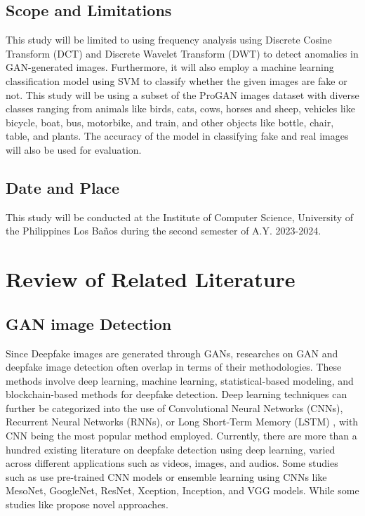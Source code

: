 \documentclass[journal]{./IEEE/IEEEtran}
\begin{document}
\subsection{Scope and Limitations}
This study will be limited to using frequency analysis using Discrete Cosine Transform (DCT) and Discrete Wavelet Transform (DWT) to detect anomalies in GAN-generated images. Furthermore, it will also employ a machine learning classification model using SVM to classify whether the given images are fake or not. This study will be using a subset of the ProGAN images dataset with diverse classes ranging from animals like birds, cats, cows, horses and sheep, vehicles like bicycle, boat, bus, motorbike, and train, and other objects like bottle, chair, table, and plants. The accuracy of the model in classifying fake and real images will also be used for evaluation. 


\subsection{Date and Place}
This study will be conducted at the Institute of Computer Science, University of the Philippines Los Baños during the second semester of A.Y. 2023-2024.


\section{Review of Related Literature}

\subsection{GAN image Detection}

\par Since Deepfake images are generated through GANs, researches on GAN and deepfake image detection often overlap in terms of their methodologies. These methods involve deep learning, machine learning, statistical-based modeling, and blockchain-based methods for deepfake detection. Deep learning techniques can further be categorized into the use of Convolutional Neural Networks (CNNs), Recurrent Neural Networks (RNNs), or Long Short-Term Memory (LSTM) \cite{deepfakeLR}, with CNN being the most popular method employed. Currently, there are more than a hundred existing literature on deepfake detection using deep learning, varied across different applications such as videos, images, and audios. Some studies such as \cite{deepfake-fourier-cnn, deepfake-spatio, deepfake-error-level, deepfake-image} use pre-trained CNN models or ensemble learning using CNNs like MesoNet, GoogleNet, ResNet, Xception, Inception, and VGG models. While some studies like \cite{deepfake-em, deepfake-mesonet, novel-deepfake} propose novel approaches.
\end{document}
